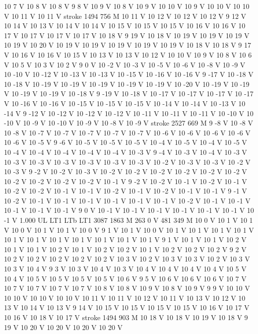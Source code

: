 {{10 7 V
10 8 V
10 8 V
9 8 V
10 9 V
10 8 V
10 9 V
10 10 V
10 9 V
10 10 V
10 10 V
10 11 V
10 11 V
stroke
1494 756 M
10 11 V
10 12 V
10 12 V
10 12 V
9 12 V
10 14 V
10 13 V
10 14 V
10 14 V
10 15 V
10 15 V
10 15 V
10 16 V
10 16 V
10 17 V
10 17 V
10 17 V
10 17 V
10 18 V
9 19 V
10 18 V
10 19 V
10 19 V
10 19 V
10 19 V
10 20 V
10 19 V
10 19 V
10 19 V
10 19 V
10 19 V
10 18 V
10 18 V
9 17 V
10 16 V
10 16 V
10 15 V
10 13 V
10 13 V
10 12 V
10 10 V
10 9 V
10 8 V
10 6 V
10 5 V
10 3 V
10 2 V
9 0 V
10 -2 V
10 -3 V
10 -5 V
10 -6 V
10 -8 V
10 -9 V
10 -10 V
10 -12 V
10 -13 V
10 -13 V
10 -15 V
10 -16 V
10 -16 V
9 -17 V
10 -18 V
10 -18 V
10 -19 V
10 -19 V
10 -19 V
10 -19 V
10 -19 V
10 -20 V
10 -19 V
10 -19 V
10 -19 V
10 -19 V
10 -18 V
9 -19 V
10 -18 V
10 -17 V
10 -17 V
10 -17 V
10 -17 V
10 -16 V
10 -16 V
10 -15 V
10 -15 V
10 -15 V
10 -14 V
10 -14 V
10 -13 V
10 -14 V
9 -12 V
10 -12 V
10 -12 V
10 -12 V
10 -11 V
10 -11 V
10 -11 V
10 -10 V
10 -10 V
10 -9 V
10 -10 V
10 -9 V
10 -8 V
10 -9 V
stroke
2527 669 M
9 -8 V
10 -8 V
10 -8 V
10 -7 V
10 -7 V
10 -7 V
10 -7 V
10 -7 V
10 -6 V
10 -6 V
10 -6 V
10 -6 V
10 -6 V
10 -5 V
9 -6 V
10 -5 V
10 -5 V
10 -5 V
10 -4 V
10 -5 V
10 -4 V
10 -5 V
10 -4 V
10 -4 V
10 -4 V
10 -4 V
10 -4 V
10 -3 V
9 -4 V
10 -3 V
10 -4 V
10 -3 V
10 -3 V
10 -3 V
10 -3 V
10 -3 V
10 -3 V
10 -3 V
10 -2 V
10 -3 V
10 -3 V
10 -2 V
10 -3 V
9 -2 V
10 -2 V
10 -3 V
10 -2 V
10 -2 V
10 -2 V
10 -2 V
10 -2 V
10 -2 V
10 -2 V
10 -2 V
10 -2 V
10 -2 V
10 -1 V
9 -2 V
10 -2 V
10 -1 V
10 -2 V
10 -1 V
10 -2 V
10 -2 V
10 -1 V
10 -1 V
10 -2 V
10 -1 V
10 -2 V
10 -1 V
10 -1 V
9 -1 V
10 -2 V
10 -1 V
10 -1 V
10 -1 V
10 -1 V
10 -1 V
10 -1 V
10 -2 V
10 -1 V
10 -1 V
10 -1 V
10 -1 V
10 -1 V
9 0 V
10 -1 V
10 -1 V
10 -1 V
10 -1 V
10 -1 V
10 -1 V
10 -1 V
1.000 UL
LT1
LTb
LT1
3087 1863 M
263 0 V
481 349 M
10 0 V
10 1 V
10 1 V
10 0 V
10 1 V
10 1 V
10 0 V
9 1 V
10 1 V
10 0 V
10 1 V
10 1 V
10 1 V
10 1 V
10 1 V
10 1 V
10 1 V
10 1 V
10 1 V
10 1 V
10 1 V
9 1 V
10 1 V
10 1 V
10 2 V
10 1 V
10 1 V
10 2 V
10 1 V
10 2 V
10 2 V
10 1 V
10 2 V
10 2 V
10 2 V
9 2 V
10 2 V
10 2 V
10 2 V
10 2 V
10 2 V
10 3 V
10 2 V
10 3 V
10 3 V
10 2 V
10 3 V
10 3 V
10 4 V
9 3 V
10 3 V
10 4 V
10 3 V
10 4 V
10 4 V
10 4 V
10 4 V
10 5 V
10 4 V
10 5 V
10 5 V
10 5 V
10 5 V
10 6 V
9 5 V
10 6 V
10 6 V
10 6 V
10 7 V
10 7 V
10 7 V
10 7 V
10 7 V
10 8 V
10 8 V
10 9 V
10 8 V
10 9 V
9 9 V
10 10 V
10 10 V
10 10 V
10 10 V
10 11 V
10 11 V
10 12 V
10 11 V
10 13 V
10 12 V
10 13 V
10 14 V
10 13 V
9 14 V
10 15 V
10 15 V
10 15 V
10 15 V
10 16 V
10 17 V
10 16 V
10 18 V
10 17 V
stroke
1494 903 M
10 18 V
10 18 V
10 19 V
10 18 V
9 19 V
10 20 V
10 20 V
10 20 V
10 20 V
}}
